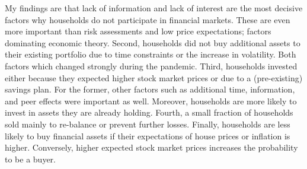 \documentclass[ProjectABM]{subfiles}
\begin{document}
My findings are that lack of information and lack of interest are the most decisive factors why households do not participate in financial markets. These are even more important than risk assessments and low price expectations; factors dominating economic theory. %
Second, households did not buy additional assets to their existing portfolio due to time constraints or the increase in volatility. Both factors which changed strongly during the pandemic. Third, households invested either because they expected higher stock market prices or due to a (pre-existing) savings plan. For the former, other factors such as additional time, information, and peer effects were important as well. Moreover, households are more likely to invest in assets they are already holding. Fourth, a small fraction of households sold mainly to re-balance or prevent further losses. Finally, households are less likely to buy financial assets if their expectations of house prices or inflation is higher. Conversely, higher expected stock market prices increases the probability to be a buyer.
\end{document}
